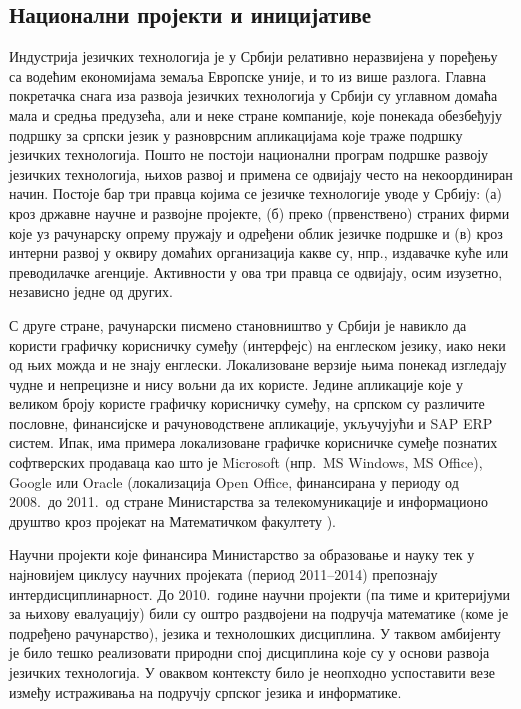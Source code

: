 \begin{multicols}{2}
 \subsection {Национални пројекти и иницијативе}
   
Индустрија језичких технологија је у Србији релативно неразвијена у поређењу са водећим економијама земаља Европске уније, и то из више разлога. Главна покретачка снага иза развоја језичких технологија у Србији су углавном домаћа мала и средња предузећа, али и неке стране компаније, које понекада обезбеђују подршку за српски језик у разноврсним апликацијама које траже подршку језичких технологија. Пошто не постоји национални програм подршке развоју језичких технологија, њихов развој и примена се одвијају често на некоординиран начин. Постоје бар три правца којима се језичке технологије уводе у Србију: (а) кроз државне научне и развојне пројекте, (б) преко (првенствено) страних фирми које уз рачунарску опрему пружају и одређени облик језичке подршке и (в) кроз интерни развој у оквиру домаћих организација какве су, нпр., издавачке куће или преводилачке агенције. Активности у ова три правца се одвијају, осим изузетно, независно једне од других. 

С друге стране, рачунарски писмено становништво у Србији је навикло да користи графичку корисничку сумеђу (интерфејс) на енглеском језику, иако неки од њих можда и не знају енглески. Локализоване верзије њима понекад изгледају чудне и непрецизне и нису вољни да их користе. Једине апликације које у великом броју користе  графичку корисничку сумеђу, на српском су различите пословне, финансијске и рачуноводствене апликације, укључујући и SAP ERP систем. Ипак, има примера локализоване графичке корисничке сумеђе познатих софтверских продаваца као што је Microsoft (нпр.~MS Windows, MS Office), Google или Oracle (локализација Open Office, финансирана у периоду од 2008.~до 2011.~од стране Министарства за телекомуникације и информационо друштво кроз пројекат на Математичком факултету \cite{OO_MATF}).

Научни пројекти које финансира Министарство за образовање и науку тек у најновијем циклусу научних пројеката (период 2011--2014) препознају интердисциплинарност. До 2010.~године научни пројекти (па тиме и критеријуми за њихову евалуацију) били су оштро раздвојени на подручја математике (коме је подређено рачунарство), језика и технолошких дисциплина. У таквом амбијенту је било тешко реализовати природни спој дисциплина које су у основи развоја језичких технологија. У оваквом контексту било је неопходно успоставити везе између истраживања на подручју српског језика и информатике. 


\end{multicols}
